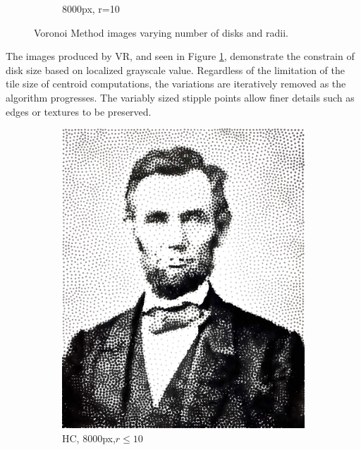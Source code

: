 \documentclass[11pt]{article}
\begin{document}
\begin{figure}[H]
\begin{subfigure}[b]{0.2\linewidth}
		\caption{8000px, r=10}
	\end{subfigure}
	\caption{Voronoi Method images varying number of disks and radii.}
	\label{fig:vc_points1}
\end{figure}

The images produced by VR, and seen in Figure \ref{fig:vc_points1}, demonstrate the constrain of disk size based on localized grayscale value. Regardless of the limitation of the tile size of centroid computations, the variations are iteratively removed as the algorithm progresses. The variably sized stipple points allow finer details such as edges or textures to be preserved.

\begin{figure}[H]
	\centering
	\begin{subfigure}[b]{0.4\linewidth}
		\includegraphics[width=\linewidth]{pix/hc_AL_8000_r10.png}
		\caption{HC, 8000px,$r \le 10$}
	\end{subfigure}
	\begin{subfigure}[b]{0.4\linewidth}

\end{subfigure}
\end{figure}
\end{document}
